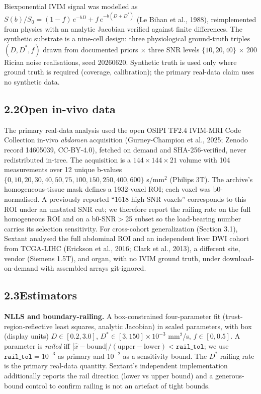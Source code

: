 \documentclass[11pt]{article}
\newcommand{\Dstar}{\ensuremath{D^{*}}}
\newcommand{\Szero}{\ensuremath{S_{0}}}
\begin{document}
Biexponential IVIM signal was modelled as
$S(b)/\Szero = (1-f)\,e^{-bD} + f\,e^{-b(D+\Dstar{})}$ (Le Bihan et al., 1988),
reimplemented from physics with an analytic Jacobian verified against finite differences.
The synthetic substrate is a nine-cell design: three physiological ground-truth triples
$(D,\Dstar{},f)$ drawn from documented priors $\times$ three SNR levels
$\{10, 20, 40\}$ $\times$ 200 Rician noise realisations, seed 20260620. Synthetic truth
is used only where ground truth is required (coverage, calibration); the primary
real-data claim uses no synthetic data.

\subsection*{2.2\quad Open in-vivo data}

The primary real-data analysis used the open OSIPI TF2.4 IVIM-MRI Code Collection
in-vivo \emph{abdomen} acquisition (Gurney-Champion et al., 2025; Zenodo record
14605039, CC-BY-4.0), fetched on demand and SHA-256-verified, never redistributed
in-tree. The acquisition is a $144\times144\times21$ volume with 104 measurements over
12 unique b-values $\{0,10,20,30,40,50,75,100,150,250,400,600\}$ s/mm$^2$ (Philips 3T).
The archive's homogeneous-tissue mask defines a 1932-voxel ROI; each voxel was
b0-normalised. A previously reported ``1618 high-SNR voxels'' corresponds to this ROI
under an unstated SNR cut; we therefore report the railing rate on the full
homogeneous ROI and on a b0-SNR$>$25 subset so the load-bearing number carries its
selection sensitivity. For cross-cohort generalization (Section 3.1), Sextant analysed
the full abdominal ROI and an independent liver DWI cohort from TCGA-LIHC (Erickson et
al., 2016; Clark et al., 2013), a different site, vendor (Siemens 1.5T), and organ, with
no IVIM ground truth, under download-on-demand with assembled arrays git-ignored.

\subsection*{2.3\quad Estimators}

\textbf{NLLS and boundary-railing.} A box-constrained four-parameter fit
(trust-region-reflective least squares, analytic Jacobian) in scaled parameters, with box
(display units) $D\in[0.2,3.0]$, $\Dstar{}\in[3,150]\times10^{-3}$ mm$^2$/s,
$f\in[0,0.5]$. A parameter is \emph{railed} iff
$|\hat{x}-\text{bound}|/(\text{upper}-\text{lower}) < \texttt{rail\_tol}$; we use
$\texttt{rail\_tol}=10^{-3}$ as primary and $10^{-2}$ as a sensitivity bound. The
\Dstar{} railing rate is the primary real-data quantity. Sextant's independent
implementation additionally reports the rail direction (lower vs upper bound) and a
generous-bound control to confirm railing is not an artefact of tight bounds.
\end{document}
